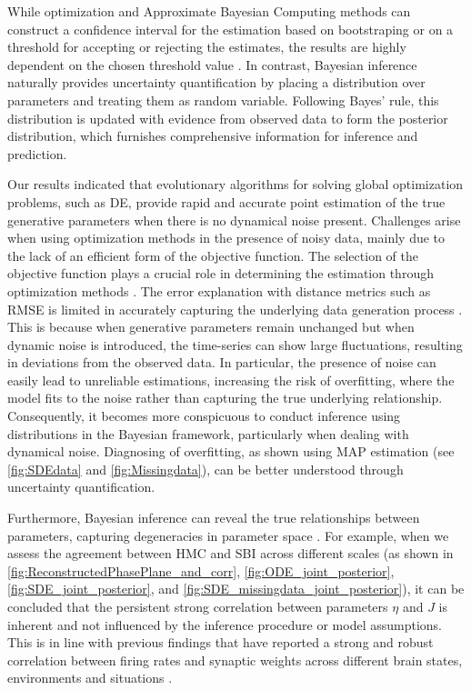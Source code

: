 \documentclass[12pt]{article}
\begin{document}
While optimization and Approximate Bayesian Computing methods can construct a confidence interval for the estimation based on bootstraping or on a threshold for accepting or rejecting the estimates, the results are highly dependent on the chosen threshold value \citep{Beaumont2002, Cranmer2020}. In contrast, Bayesian inference naturally provides uncertainty quantification by placing a distribution over parameters and treating them as random variable. Following Bayes' rule, this distribution is updated with evidence from observed data to form the posterior distribution, which furnishes comprehensive information for inference and prediction. 

Our results indicated that evolutionary algorithms for solving global optimization problems, such as DE, provide rapid and accurate point estimation of the true generative parameters when there is no dynamical noise present.
Challenges arise when using optimization methods in the presence of noisy data, mainly due to the lack of an efficient form of the objective function. The selection of the objective function plays a crucial role in determining the estimation through optimization methods \citep{Svensson2012, Hashemi2018}. The error explanation with distance metrics such as RMSE is limited in accurately capturing the underlying data generation process \citep{Baldy2023}. This is because when generative parameters remain unchanged but when dynamic noise is introduced, the time-series can show large fluctuations, resulting in deviations from the observed data. In particular, the presence of noise can easily lead to unreliable estimations, increasing the risk of overfitting, where the model fits to the noise rather than capturing the true underlying relationship. Consequently, it becomes more conspicuous to conduct inference using distributions in the Bayesian framework, particularly when dealing with dynamical noise.  Diagnosing of overfitting, as shown using MAP estimation (see \autoref{fig:SDEdata} and \autoref{fig:Missingdata}), can be better understood through uncertainty quantification. 

Furthermore, Bayesian inference can reveal the true relationships between parameters, capturing degeneracies in parameter space \citep{Edelman2001, Hashemi2023}. For example, when we assess the agreement between HMC and SBI across different scales (as shown in \autoref{fig:ReconstructedPhasePlane_and_corr}, \autoref{fig:ODE_joint_posterior}, \autoref{fig:SDE_joint_posterior}, and \autoref{fig:SDE_missingdata_joint_posterior}), it can be concluded that the persistent strong correlation between parameters $\eta$ and $J$ is inherent and not influenced by the inference procedure or model assumptions. This is in line with previous findings that have reported a strong and robust correlation between firing rates and synaptic weights across different brain states, environments and situations \citep{Buzsaki2014}. 
\end{document}
